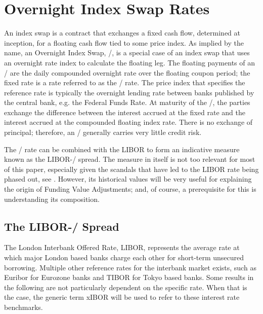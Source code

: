 \documentclass[main.tex]{subfiles}
\begin{document}
    \section{Overnight Index Swap Rates}
    
    An index swap is a contract that exchanges a fixed cash flow, determined at inception,
    for a floating cash flow tied to some price index.
    As implied by the name, an Overnight Index Swap, \OIS/, is a special case of an index swap
    that uses an overnight rate index to calculate the floating leg.
    The floating payments of an \OIS/ are the daily compounded overnight rate 
    over the floating coupon period;
    the fixed rate is a rate referred to as the \OIS/ rate.
    The price index that specifies the reference rate is typically the overnight 
    lending rate between banks published by the central bank, e.g. the Federal Funds Rate.
    At maturity of the \OIS/, the parties exchange the difference between the interest accrued 
    at the fixed rate and the interest accrued at the compounded floating index rate.
    There is no exchange of principal; 
    therefore, an \OIS/ generally carries very little credit risk. 

    The \OIS/ rate can be combined with the LIBOR to form an indicative measure
    known as the LIBOR-\OIS/ spread.
    The measure in itself is not too relevant for most of this paper,
    especially given the scandals that have led to the LIBOR rate being phased out,
    see \textcite{ForbesLibor}.
    However, its historical values will be very useful 
    for explaining the origin of Funding Value Adjustments;
    and, of course, a prerequisite for this is understanding its composition.

    \subsection{The LIBOR-\OIS/ Spread}

    The London Interbank Offered Rate, LIBOR, represents the average rate 
    at which major London based banks charge each other for short-term unsecured borrowing.
    Multiple other reference rates for the interbank market exists, 
    such as Euribor for Eurozone banks and TIBOR for Tokyo based banks.
    Some results in the following are not particularly dependent on the specific rate.
    When that is the case, the generic term xIBOR will be used 
    to refer to these interest rate benchmarks.
\end{document}
